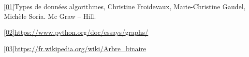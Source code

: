 \begin{defi}[Arête]

\end{defi}


\begin{defi}[Boucle]

\end{defi}


\begin{defi}

\end{defi}



\begin{defi}

\end{defi}


\begin{defi}[Cycle]

\end{defi}


\begin{defi}

\end{defi}







\ref{01}{Types de données algorithmes, Christine Froidevaux, Marie-Christine Gaudel, Michèle Soria. Mc Graw -- Hill.}

\ref{02}{\url{https://www.python.org/doc/essays/graphs/}}

\ref{03}{\url{https://fr.wikipedia.org/wiki/Arbre_binaire}}
